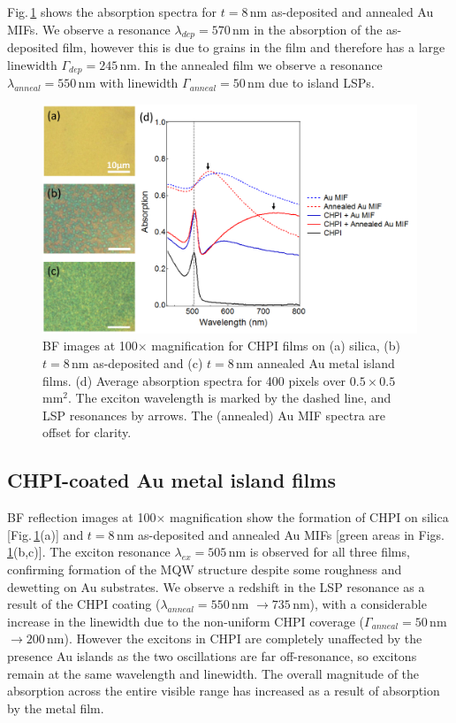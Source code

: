 Fig.\,\ref{6Fig3} shows the absorption spectra for $t=8$\,nm as-deposited and annealed Au MIFs. We observe a resonance $\lambda_{dep} = 570$\,nm in the absorption of the as-deposited film, however this is due to grains in the film and therefore has a large linewidth $\Gamma_{dep} = 245$\,nm. In the annealed film we observe a resonance $\lambda_{anneal} = 550$\,nm with linewidth $\Gamma_{anneal} = 50$\,nm due to island LSPs.

\begin{figure}[h!] 
\centering    
\includegraphics[width=\textwidth]{Fig3}
\caption{BF images at 100$\times$ magnification for CHPI films on (a) silica, (b) $t=8$\,nm as-deposited and (c) $t=8$\,nm annealed Au metal island films. (d) Average absorption spectra for 400 pixels over $0.5\times0.5$\,mm$^2$. The exciton wavelength is marked by the dashed line, and LSP resonances by arrows. The (annealed) Au MIF spectra are offset for clarity.}
\label{6Fig3}
\end{figure}
\subsection{CHPI-coated Au metal island films}

BF reflection images at 100$\times$ magnification show the formation of CHPI on silica [Fig.\,\ref{6Fig3}(a)] and $t=8$\,nm as-deposited and annealed Au MIFs [green areas in Figs.\,\ref{6Fig3}(b,c)]. The exciton resonance $\lambda_{ex} = 505$\,nm is observed for all three films, confirming formation of the MQW structure despite some roughness and dewetting on Au substrates. We observe a redshift in the LSP resonance as a result of the CHPI coating ($\lambda_{anneal} = 550$\,nm $\rightarrow 735$\,nm), with a considerable increase in the linewidth due to the non-uniform CHPI coverage ($\Gamma_{anneal} = 50$\,nm $\rightarrow 200$\,nm). However the excitons in CHPI are completely unaffected by the presence Au islands as the two oscillations are far off-resonance, so excitons remain at the same wavelength and linewidth. The overall magnitude of the absorption across the entire visible range has increased as a result of absorption by the metal film.

